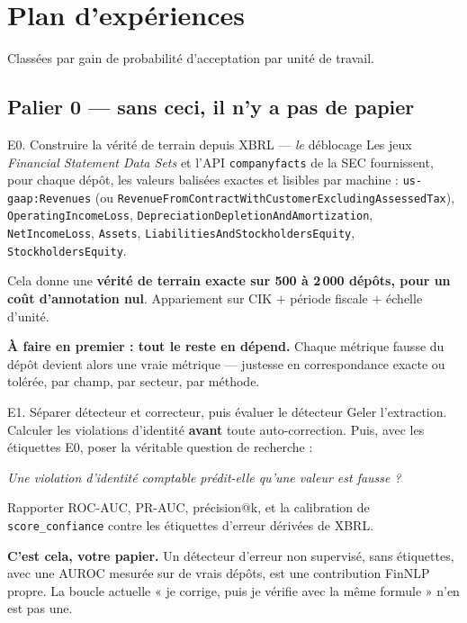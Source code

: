 \documentclass[11pt,a4paper]{article}
\newcommand{\fic}[1]{\texttt{\small #1}}
\begin{document}
\section{Plan d'expériences}
\label{sec:exp}

Classées par gain de probabilité d'acceptation par unité de travail.

\subsection{Palier 0 --- sans ceci, il n'y a pas de papier}

\begin{exper}{E0. Construire la vérité de terrain depuis XBRL --- \textit{le} déblocage}
Les jeux \textit{Financial Statement Data Sets} et l'API \fic{companyfacts} de
la SEC fournissent, pour chaque dépôt, les valeurs balisées exactes et lisibles
par machine :
\fic{us-gaap:Revenues} (ou
\fic{RevenueFromContractWithCustomerExcludingAssessedTax}),
\fic{OperatingIncomeLoss},
\fic{DepreciationDepletionAndAmortization}, \fic{NetIncomeLoss},
\fic{Assets}, \fic{LiabilitiesAndStockholdersEquity},
\fic{StockholdersEquity}.

Cela donne une \textbf{vérité de terrain exacte sur 500 à 2\,000 dépôts, pour un
coût d'annotation nul}. Appariement sur CIK $+$ période fiscale $+$ échelle
d'unité.

\textbf{À faire en premier : tout le reste en dépend.} Chaque métrique fausse du
dépôt devient alors une vraie métrique — justesse en correspondance exacte ou
tolérée, par champ, par secteur, par méthode.
\end{exper}

\begin{exper}{E1. Séparer détecteur et correcteur, puis évaluer le détecteur}
Geler l'extraction. Calculer les violations d'identité \textbf{avant} toute
auto-correction. Puis, avec les étiquettes E0, poser la véritable question de
recherche :

\begin{center}
\itshape Une violation d'identité comptable prédit-elle qu'une valeur est fausse ?
\end{center}

Rapporter ROC-AUC, PR-AUC, précision@k, et la calibration de
\fic{score\_confiance} contre les étiquettes d'erreur dérivées de XBRL.

\textbf{C'est cela, votre papier.} Un détecteur d'erreur non supervisé, sans
étiquettes, avec une AUROC mesurée sur de vrais dépôts, est une contribution
FinNLP propre. La boucle actuelle « je corrige, puis je vérifie avec la même
formule » n'en est pas une.
\end{exper}
\end{document}
